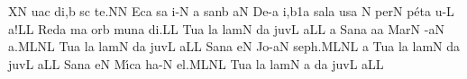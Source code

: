 \initiumgregorianum
{}%
\sgn {}{}X\punctum N\egn
{}u\pes ac\egn
\sgn di,\punctum b\egn
\spatium
{}s\punctum c\egn
\sgn te.\punctum N\augmentum N\egn
\spatium
\divisiofinalis
\spatium
\sgn {}Ec\punctum a\egn
{}s\punctum a\egn
\sgn {}i-\punctum N\egn
\sgn {}{\ae}{}\punctum a\egn
\spatium
\sgn s{a}n\punctum b\egn
{}\clivis aN\egn
\spatium
\sgn D{e}-\punctum a\egn
\sgn {}i,\episem b1\punctum a\egn
\spatium
\divisiominor
\spatium
\sgn s{a}l\punctum a\egn
\sgn {}us\punctum a\egn
\spatium
\custos N
\lineaproxima
\sgn per\punctum N\egn
\sgn p{\'e}t\punctum a\egn
\sgn {}u-\punctum L\egn
\sgn {}a!\punctum L\augmentum L\egn
\spatium
\divisiofinalis
\spatium
\sgn Red\punctum a\egn
{}m\punctum a\egn
{}or\punctum b\egn
\spatium
\sgn m{u}n\punctum a\egn
\sgn di.\punctum L\augmentum L\egn
\spatium
\divisiofinalis
\spatium
\sgn Tu{}\chorus\punctum a\egn
\spatium
{}l\punctum a\egn
\sgn lam\punctum N\egn
\spatium
{}d\punctum a\egn
\sgn juv\punctum L\egn
\sgn {}a{}\punctum L\augmentum L\egn
\spatium
\divisiofinalis
\spatium
\custos a
\lineaproxima
\sgn S{a}n\cantores\punctum a\egn
{}a{}\punctum a\egn
\spatium
\sgn Mar\punctum N\egn
\sgn {}{\'\i}-\clivis aN\egn
\sgn {}a.\clivis ML\augmentumduplex NL\egn
\spatium
\divisiofinalis
\spatium
\sgn Tu{}\chorus\punctum a\egn
\spatium
{}l\punctum a\egn
\sgn lam\punctum N\egn
\spatium
{}d\punctum a\egn
\sgn juv\punctum L\egn
\sgn {}a{}\punctum L\augmentum L\egn
\spatium
\divisiofinalis
\spatium
\sgn S{a}n\cantores\punctum a\egn
{}e{}\punctum N\egn
\spatium
\sgn J{o}-\clivis aN\egn
\sgn se{ph.}\clivis ML\augmentumduplex NL\egn
\spatium
\divisiofinalis
\spatium
\custos a
\lineaproxima
\sgn Tu{}\chorus\punctum a\egn
\spatium
{}l\punctum a\egn
\sgn lam\punctum N\egn
\spatium
{}d\punctum a\egn
\sgn juv\punctum L\egn
\sgn {}a{}\punctum L\augmentum L\egn
\spatium
\divisiofinalis
\spatium
\sgn S{a}n\cantores\punctum a\egn
{}e{}\punctum N\egn
\spatium
\sgn M{\'\i}c\punctum a\egn
\sgn ha-\punctum N\egn
\sgn {}e{l.}\clivis ML\augmentumduplex NL\egn
\spatium
\divisiofinalis
\spatium
\sgn Tu{}\chorus\punctum a\egn
\spatium
{}l\punctum a\egn
\sgn lam\punctum N\egn
\spatium
\custos a
\lineaproxima
{}d\punctum a\egn
\sgn juv\punctum L\egn
\sgn {}a{}\punctum L\augmentum L\egn
\spatium
\Finisgregoriana

